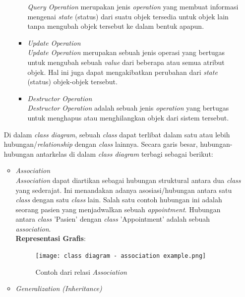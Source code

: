 \documentclass[a4paper]{article}
\begin{document}
\begin{enumerate}
\begin{itemize}
\begin{itemize}
            \textit{Query Operation} merupakan jenis \textit{operation} yang membuat informasi mengenai \textit{state} (status) dari suatu objek tersedia untuk objek lain tanpa mengubah objek tersebut ke dalam bentuk apapun\autocite{systemanalysisdesign-class-diagram}.
            \item \textit{Update Operation}\\
            \textit{Update Operation} merupakan sebuah jenis operasi yang bertugas untuk mengubah sebuah \textit{value} dari beberapa atau semua atribut objek. Hal ini juga dapat mengakibatkan perubahan dari \textit{state} (status) objek-objek tersebut\autocite{systemanalysisdesign-class-diagram}.
            \item \textit{Destructor Operation}\\
            \textit{Destructor Operation} adalah sebuah jenis \textit{operation} yang bertugas untuk menghapus atau menghilangkan objek dari sistem tersebut\autocite{systemanalysisdesign-class-diagram}.
        \end{itemize}
    \end{itemize}
    Di dalam \textit{class diagram}, sebuah \textit{class} dapat terlibat dalam satu atau lebih hubungan/\textit{relationship} dengan \textit{class} lainnya. Secara garis besar, hubungan-hubungan antarkelas di dalam \textit{class diagram} terbagi sebagai berikut:
    \begin{itemize}
        \item \textit{Association}\\
        \textit{Association} dapat diartikan sebagai hubungan struktural antara dua \textit{class} yang sederajat\autocite{what-is-class-diagram}. Ini menandakan adanya asosiasi/hubungan antara satu \textit{class} dengan satu \textit{class} lain. Salah satu contoh hubungan ini adalah seorang pasien yang menjadwalkan sebuah \textit{appointment}. Hubungan antara \textit{class} 'Pasien' dengan \textit{class} 'Appointment' adalah sebuah \textit{association}\autocite{systemanalysisdesign-class-diagram-relations}.\\
        \textbf{Representasi Grafis}:\\
        \begin{figure}[h]
            \centering
            \texttt{[image: class diagram - association example.png]}
            \caption{Contoh dari relasi \textit{Association}}
        \end{figure}
        \item \textit{Generalization (Inheritance)}\\

\end{itemize}
\end{enumerate}
\end{document}
